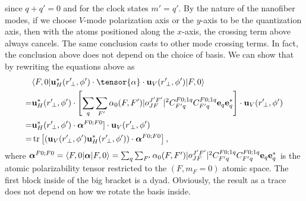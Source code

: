 \documentclass[preprint,aps,pra,onecolumn]{revtex4-1} %
\begin{document}
since $q+q' = 0$ and for the clock states $m' = q'$. By the nature of the nanofiber modes, if we choose 
$V$-mode polarization axis or the $y$-axis to be the quantization axis, then with the atoms positioned 
along the $x$-axis, the crossing term above always cancels. The same conclusion casts to other mode crossing 
terms. In fact, the conclusion above does not depend on the choice of basis. We can show that by 
rewriting the equations above as
\begin{align}
&\bra{F,0} \mathbf{u}^*_H(r^\prime\!_\perp, \phi') \cdot \tensor{\alpha} \cdot 
	\mathbf{u}_{V}(r^\prime\!_\perp, \phi') \ket{F,0}\nonumber\\
=& \mathbf{u}^*_H(r^\prime\!_\perp, 
 \phi')\cdot \left[  \sum_{q} \sum_{F'}\alpha_0(F,F') 
   |o^{J'F'}_{JF} |^2 C^{F 	0;1q}_{F' q} C^{F 0;1q}_{F' q}
     	  \mathbf{e}_q \mathbf{e}^*_{q}  \right]\cdot \mathbf{u}_V(r^\prime\!_\perp, \phi') \\
=& \mathbf{u}^*_H(r^\prime\!_\perp,  \phi')\cdot \boldsymbol{\alpha}^{F0;F0}]\cdot 
\mathbf{u}_V(r^\prime\!_\perp, \phi') \\
=& \tr\left[ \left(  \mathbf{u}_V(r^\prime\!_\perp, \phi')  \mathbf{u}^*_H(r^\prime\!_\perp,  \phi')\right)
\cdot  \boldsymbol{\alpha}^{F0;F0} \right],
\end{align}
where $  \boldsymbol{\alpha}^{F0;F0} = \langle{F,0}\rvert\boldsymbol{\alpha}\lvert{F,0}\rangle = \sum_{q} 
\sum_{F'}\alpha_0(F,F') 
   |o^{J'F'}_{JF} |^2 C^{F 	0;1q}_{F' q} C^{F 0;1q}_{F' q}
     	  \mathbf{e}_q \mathbf{e}^*_{q} $ is the atomic 
polarizability tensor restricted to the $ (F,m_F=0) $ atomic space. The first block inside of the big bracket 
is a dyad. Obviously, the result as a trace does not depend on how we rotate the basis inside. 
 
\end{document}
